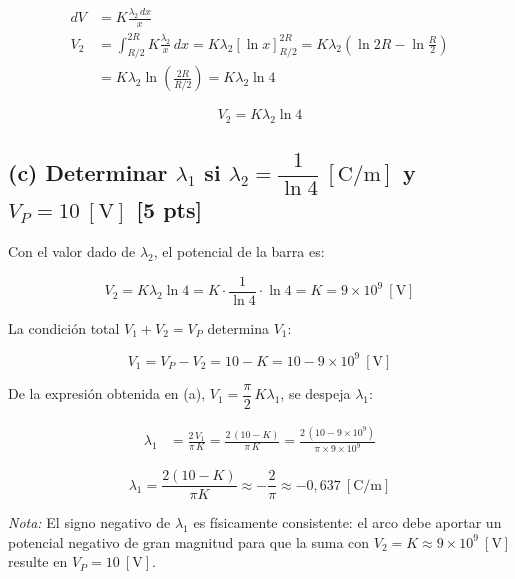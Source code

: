\documentclass[12pt,letterpaper]{article}
\begin{document}
\begin{align*}
    dV &= K\frac{\lambda_2\,dx}{x}\\[6pt]
    V_2 &= \int_{R/2}^{2R} K\frac{\lambda_2}{x}\,dx
          = K\lambda_2\left[\ln x\right]_{R/2}^{2R}
          = K\lambda_2\left(\ln 2R - \ln\frac{R}{2}\right)\\[6pt]
        &= K\lambda_2\ln\!\left(\frac{2R}{R/2}\right)
          = K\lambda_2\ln 4
\end{align*}

\[
    \boxed{V_2 = K\lambda_2\ln 4}
\]

\subsection*{(c) Determinar $\lambda_1$ si $\lambda_2 = \dfrac{1}{\ln 4}\ [\text{C/m}]$ y $V_P = 10\ [\text{V}]$ \hfill \normalfont\small[5 pts]}

Con el valor dado de $\lambda_2$, el potencial de la barra es:

\[
    V_2 = K\lambda_2\ln 4 = K\cdot\frac{1}{\ln 4}\cdot\ln 4 = K = 9\times10^{9}\ [\text{V}]
\]

La condici\'on total $V_1 + V_2 = V_P$ determina $V_1$:

\[
    V_1 = V_P - V_2 = 10 - K = 10 - 9\times10^{9}\ [\text{V}]
\]

De la expresi\'on obtenida en (a), $V_1 = \dfrac{\pi}{2}\,K\lambda_1$, se despeja $\lambda_1$:

\begin{align*}
    \lambda_1 &= \frac{2\,V_1}{\pi\,K}
               = \frac{2\,(10 - K)}{\pi\,K}
               = \frac{2\,(10 - 9\times10^{9})}{\pi\times 9\times10^{9}}
\end{align*}

\[
    \boxed{\lambda_1 = \frac{2(10-K)}{\pi K} \approx -\frac{2}{\pi} \approx -0{,}637\ [\text{C/m}]}
\]

\noindent\small\textit{Nota:} El signo negativo de $\lambda_1$ es f\'isicamente consistente: el arco debe aportar un potencial negativo de gran magnitud para que la suma con $V_2 = K \approx 9\times10^{9}\ [\text{V}]$ resulte en $V_P = 10\ [\text{V}]$.\normalsize
\end{document}
